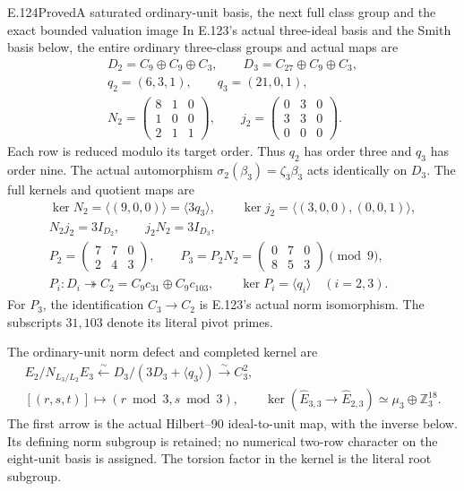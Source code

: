 \begin{statement}{E.124}{Proved}{A saturated ordinary-unit basis, the next full class group and the exact bounded valuation image}
In E.123's actual three-ideal basis and the Smith basis below,
the entire ordinary three-class groups and actual maps are
\[
 \begin{gathered}
 D_2=C_9\oplus C_9\oplus C_3,\qquad
 D_3=C_{27}\oplus C_9\oplus C_3,\\
 q_2=(6,3,1),\qquad q_3=(21,0,1),\\
 N_2=\begin{pmatrix}8&1&0\\1&0&0\\2&1&1\end{pmatrix},
 \qquad
 j_2=\begin{pmatrix}0&3&0\\3&3&0\\0&0&0\end{pmatrix}.
 \end{gathered}
 \tag{E124.3}
\]
Each row is reduced modulo its target order. Thus $q_2$ has order
three and $q_3$ has order nine. The actual automorphism
$\sigma_2(\beta_3)=\zeta_3\beta_3$ acts identically on $D_3$.
The full kernels and quotient maps are
\[
 \begin{gathered}
 \ker N_2=\langle(9,0,0)\rangle=\langle3q_3\rangle,\qquad
 \ker j_2=\langle(3,0,0),(0,0,1)\rangle,\\
 N_2j_2=3I_{D_2},\qquad j_2N_2=3I_{D_3},\\
 P_2=\begin{pmatrix}7&7&0\\2&4&3\end{pmatrix},\qquad
 P_3=P_2N_2=\begin{pmatrix}0&7&0\\8&5&3\end{pmatrix}\pmod9,\\
 P_i:D_i\twoheadrightarrow C_2=C_9c_{31}\oplus C_9c_{103},
 \qquad \ker P_i=\langle q_i\rangle\quad(i=2,3).
 \end{gathered}
 \tag{E124.4}
\]
For $P_3$, the identification $C_3\to C_2$ is E.123's actual
norm isomorphism. The subscripts $31,103$ denote its literal
pivot primes.

The ordinary-unit norm defect and completed kernel are
\[
 \begin{gathered}
 E_2/N_{L_3/L_2}E_3\xleftarrow{\sim}
 D_3/(3D_3+\langle q_3\rangle)\xrightarrow{\sim}C_3^2,\\
 [(r,s,t)]\longmapsto(r\bmod3,s\bmod3),\qquad
 \ker(\widehat E_{3,3}\to\widehat E_{2,3})
                         \simeq\mu_3\oplus\mathbb Z_3^{18}.
 \end{gathered}
 \tag{E124.5}
\]
The first arrow is the actual Hilbert--90 ideal-to-unit map,
with the inverse below. Its defining norm subgroup is retained;
no numerical two-row character on the eight-unit basis is assigned.
The torsion factor in the kernel is the literal root subgroup.


\end{statement}
